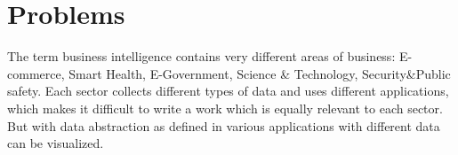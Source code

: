 \section{Problems}
The term business intelligence contains very different areas of business: E-commerce, Smart Health, E-Government, Science & Technology, Security&Public safety. Each sector collects different types of data and uses different applications, which makes it difficult to write a work which is equally relevant to each sector. \cite{ChenH.ChiangR.Sorey2012}
But with data abstraction as defined in \cite{Aigner2007} various applications with different data can be visualized.

